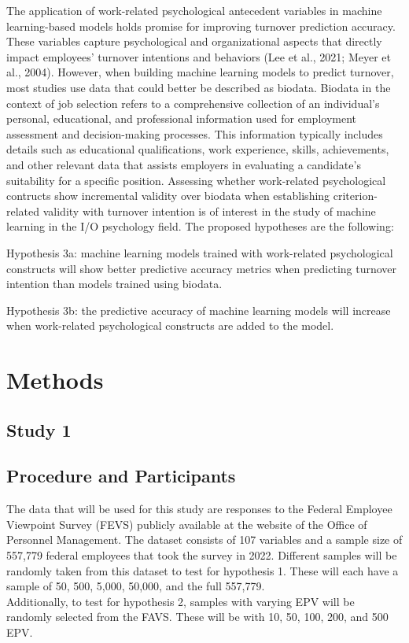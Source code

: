 \documentclass[
  jou]{apa6}
\begin{document}
The application of work-related psychological antecedent variables in machine learning-based models holds promise for improving turnover prediction accuracy.
These variables capture psychological and organizational aspects that directly impact employees' turnover intentions and behaviors (Lee et al., 2021; Meyer et al., 2004). However, when building machine learning models to predict turnover, most studies use data that could better be described as biodata. Biodata in the context of job selection refers to a comprehensive collection of an individual's personal, educational, and professional information used for employment assessment and decision-making processes. This information typically includes details such as educational qualifications, work experience, skills, achievements, and other relevant data that assists employers in evaluating a candidate's suitability for a specific position.
Assessing whether work-related psychological contructs show incremental validity over biodata when establishing criterion-related validity with turnover intention is of interest in the study of machine learning in the I/O psychology field.
The proposed hypotheses are the following:

Hypothesis 3a: machine learning models trained with work-related psychological constructs will show better predictive accuracy metrics when predicting turnover intention than models trained using biodata.

Hypothesis 3b: the predictive accuracy of machine learning models will increase when work-related psychological constructs are added to the model.

\hypertarget{methods}{%
\section{Methods}\label{methods}}

\hypertarget{study-1}{%
\subsection{Study 1}\label{study-1}}

\hypertarget{procedure-and-participants}{%
\subsection{Procedure and Participants}\label{procedure-and-participants}}

The data that will be used for this study are responses to the Federal Employee Viewpoint Survey (FEVS) publicly available at the website of the Office of Personnel Management.
The dataset consists of 107 variables and a sample size of 557,779 federal employees that took the survey in 2022. Different samples will be randomly taken from this dataset to test for hypothesis 1. These will each have a sample of 50, 500, 5,000, 50,000, and the full 557,779.\\
Additionally, to test for hypothesis 2, samples with varying EPV will be randomly selected from the FAVS. These will be with 10, 50, 100, 200, and 500 EPV.
\end{document}
